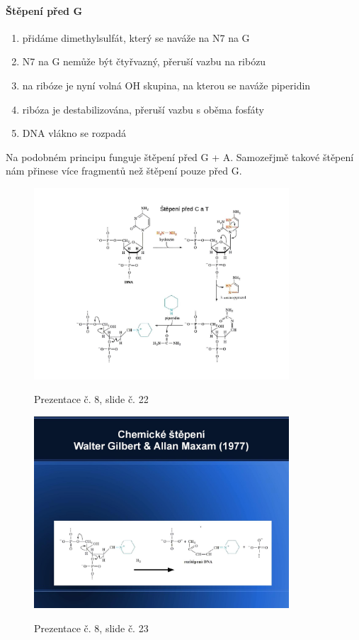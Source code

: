\documentclass[DIV=8]{scrreprt}
\begin{document}
\paragraph{Štěpení před G}
\begin{enumerate}[nosep]
    \item přidáme dimethylsulfát, který se naváže na N7 na G
    \item N7 na G nemůže být čtyřvazný, přeruší vazbu na ribózu
    \item na ribóze je nyní volná OH skupina, na kterou se naváže piperidin
    \item ribóza je destabilizována, přeruší vazbu s oběma fosfáty
    \item DNA vlákno se rozpadá
\end{enumerate}



Na podobném principu funguje štěpení před G + A. Samozeřjmě takové štěpení nám přinese více fragmentů než štěpení pouze před G.

\begin{figure}
    \caption{Prezentace č. 8, slide č. 22}
    \includegraphics[width=0.85\textwidth]{slides-8/slide-22.jpg}
    \centering
    \label{slides-8-slide-22}
\end{figure}
\begin{figure}
    \caption{Prezentace č. 8, slide č. 23}
    \includegraphics[width=0.85\textwidth]{slides-8/slide-23.jpg}
    \centering
    \label{slides-8-slide-23}
\end{figure}
\end{document}
